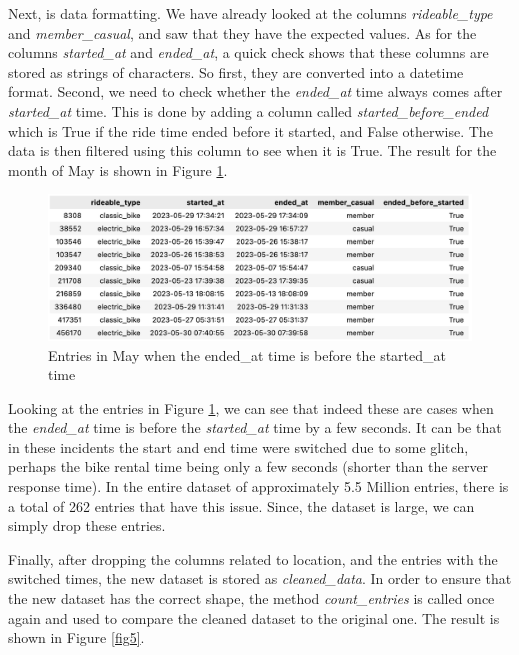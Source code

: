 \documentclass[12pt]{article}
\begin{document}
\begin{itemize}
Next, is data formatting. We have already looked at the columns \textit{rideable\_type} and \textit{member\_casual}, and saw that they have the expected values. As for the columns \textit{started\_at} and \textit{ended\_at}, a quick check shows that these columns are stored as strings of characters. So first, they are converted into a datetime format. Second, we need to check whether the \textit{ended\_at} time always comes after \textit{started\_at} time. This is done by adding a column called \textit{started\_before\_ended} which is True if the ride time ended before it started, and False otherwise. The data is then filtered using this column to see when it is True. The result for the month of May is shown in Figure \ref{fig8}.

	\begin{figure}[h]
	\centering
	\includegraphics[scale=0.56]{imgNEG.png}
	\caption{Entries in May when the ended\_at time is before the started\_at time}
	\label{fig8}
	\end{figure}

Looking at the entries in Figure \ref{fig8}, we can see that indeed these are cases when the \textit{ended\_at} time is before the \textit{started\_at} time by a few seconds. It can be that in these incidents the start and end time were switched due to some glitch, perhaps the bike rental time being only a few seconds (shorter than the server response time). In the entire dataset of approximately 5.5 Million entries, there is a total of 262 entries that have this issue. Since, the dataset is large, we can simply drop these entries.


Finally, after dropping the columns related to location, and the entries with the switched times, the new dataset is stored as \textit{cleaned\_data}. In order to ensure that the new dataset has the correct shape, the method \textit{count\_entries} is called once again and used to compare the cleaned dataset to the original one. The result is shown in Figure \ref{fig5}.
	

\end{itemize}
\end{document}
